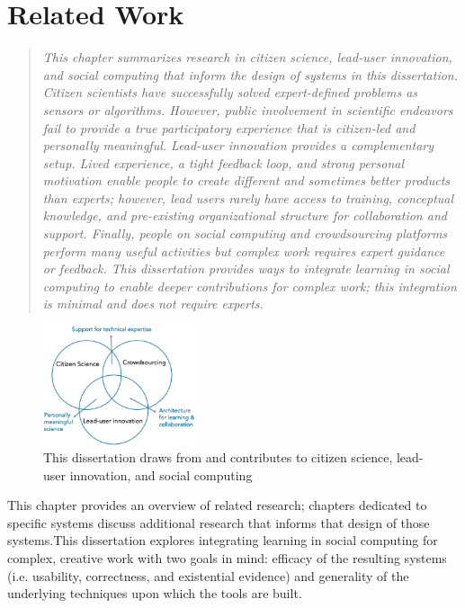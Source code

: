 \chapter{Related Work}
\begin{quote}
\emph{This chapter summarizes research in citizen science, lead-user innovation, and social computing that inform the design of systems in this dissertation. Citizen scientists have successfully solved expert-defined problems as sensors or algorithms. However, public involvement in scientific endeavors fail to provide a true participatory experience that is citizen-led and personally meaningful. Lead-user innovation provides a complementary setup. Lived experience, a tight feedback loop, and strong personal motivation enable people to create different and sometimes better products than experts; however, lead users rarely have access to training, conceptual knowledge, and pre-existing organizational structure for collaboration and support. Finally, people on social computing and crowdsourcing platforms perform many useful activities but complex work requires expert guidance or feedback. This dissertation provides ways to integrate learning in social computing to enable deeper contributions for complex work; this integration is minimal and does not require experts.} 
\end{quote}


\begin{figure}[h] 
  \centering
  \includegraphics[width=0.4\textwidth]{figures/2-related/venn.png}
  \caption[]
{This dissertation draws from and contributes to citizen science, lead-user innovation, and social computing}
  \label{fig:related-1}
\end{figure}

\vspace{0.25in}

This chapter provides an overview of related research; chapters dedicated to specific systems discuss additional research that informs that design of those systems.This dissertation explores integrating learning in social computing for complex, creative work with two goals in mind: efficacy of the resulting systems (i.e. usability, correctness, and existential evidence) and generality of the underlying techniques upon which the tools are built.

